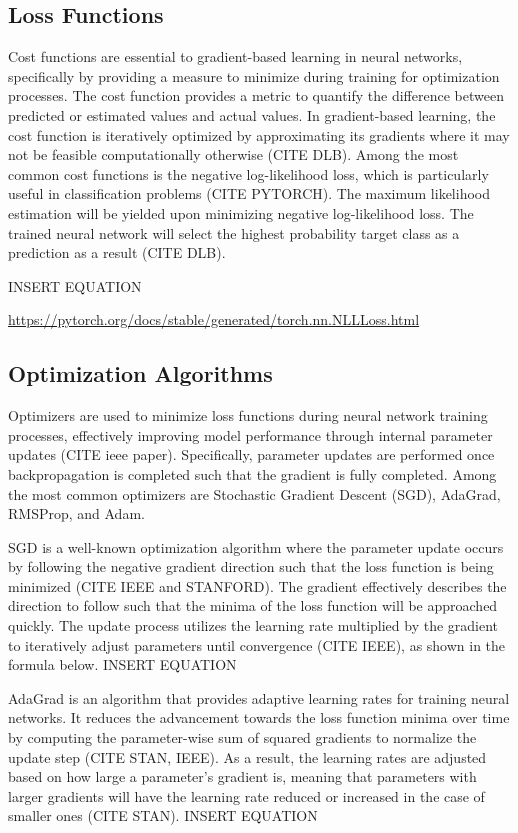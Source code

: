 \documentclass{article}
\begin{document}
\subsection{Loss Functions}
Cost functions are essential to gradient-based learning in neural networks, specifically by providing a measure to minimize during training for optimization processes. The cost function provides a metric to quantify the difference between predicted or estimated values and actual values. In gradient-based learning, the cost function is iteratively optimized by approximating its gradients where it may not be feasible computationally otherwise (CITE DLB). Among the most common cost functions is the negative log-likelihood loss, which is particularly useful in classification problems (CITE PYTORCH). The maximum likelihood estimation will be yielded upon minimizing negative log-likelihood loss. The trained neural network will select the highest probability target class as a prediction as a result (CITE DLB).
	
	INSERT EQUATION

\url{https://pytorch.org/docs/stable/generated/torch.nn.NLLLoss.html }

\subsection{Optimization Algorithms}
Optimizers are used to minimize loss functions during neural network training processes, effectively improving model performance through internal parameter updates (CITE ieee paper). Specifically, parameter updates are performed once backpropagation is completed such that the gradient is fully completed. Among the most common optimizers are Stochastic Gradient Descent (SGD), AdaGrad, RMSProp, and Adam.  

SGD is a well-known optimization algorithm where the parameter update occurs by following the negative gradient direction such that the loss function is being minimized (CITE IEEE and STANFORD). The gradient effectively describes the direction to follow such that the minima of the loss function will be approached quickly. The update process utilizes the learning rate multiplied by the gradient to iteratively adjust parameters until convergence (CITE IEEE), as shown in the formula below.
	INSERT EQUATION

AdaGrad is an algorithm that provides adaptive learning rates for training neural networks. It reduces the advancement towards the loss function minima over time by computing the parameter-wise sum of squared gradients to normalize the update step (CITE STAN, IEEE). As a result, the learning rates are adjusted based on how large a parameter’s gradient is, meaning that parameters with larger gradients will have the learning rate reduced or increased in the case of smaller ones (CITE STAN). 
	INSERT EQUATION
\end{document}
